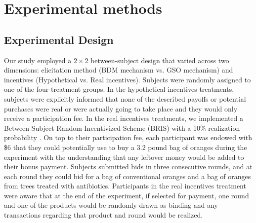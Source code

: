 \documentclass[12pt]{article}
\begin{document}


\section{Experimental methods}
\label{Experiment}

\subsection{Experimental Design}
Our study employed a $2\times2$ between-subject design that varied across two dimensions: elicitation method (BDM mechanism vs. GSO mechanism) and incentives (Hypothetical vs. Real incentives). Subjects were randomly assigned to one of the four treatment groups. In the hypothetical incentives treatments, subjects were explicitly informed that none of the described payoffs or potential purchases were real or were actually going to take place and they would only receive a participation fee. In the real incentives treatments, we implemented a Between-Subject Random Incentivized Scheme (BRIS) with a 10\% realization probability \citep{ahles_testing_2024}. On top to their participation fee, each participant was endowed with \$6 that they could potentially use to buy a 3.2 pound bag of oranges during the experiment with the understanding that any leftover money would be added to their bonus payment. Subjects submitted bids in three consecutive rounds, and at each round they could bid for a bag of conventional oranges and a bag of oranges from trees treated with antibiotics. Participants in the real incentives treatment were aware that at the end of the experiment, if selected for payment, one round and one of the products would be randomly drawn as binding and any transactions regarding that product and round would be realized.%
\end{document}
